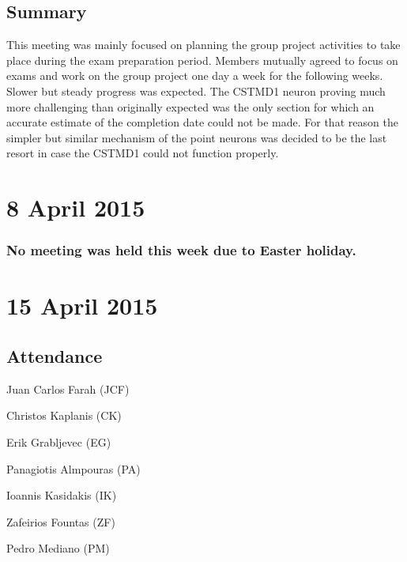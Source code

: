 \documentclass[a4paper,11pt]{article}
\begin{document}
\begin{appendices}
\subsection*{Summary}
This meeting was mainly focused on planning the group project activities to take place during the exam preparation period. Members mutually agreed to focus on exams and work on the group project one day a week for the following weeks. Slower but steady progress was expected.  The CSTMD1 neuron proving much more challenging than originally expected was the only section for which an accurate estimate of the completion date could not be made. For that reason the simpler but similar mechanism of the point neurons was decided to be the last resort in case the CSTMD1 could not function properly.

\maketitle
\section*{8 April 2015}
\subsubsection*{No meeting was held this week due to Easter holiday.}

\maketitle
\section*{15 April 2015}
\subsection*{Attendance}
\begin{compactenum}
\item Juan Carlos Farah (JCF)
\item Christos Kaplanis (CK)
\item Erik Grabljevec (EG)
\item Panagiotis Almpouras (PA)
\item Ioannis Kasidakis (IK)
\item Zafeirios Fountas (ZF)
\item Pedro Mediano (PM)
\end{compactenum}


\end{appendices}
\end{document}
